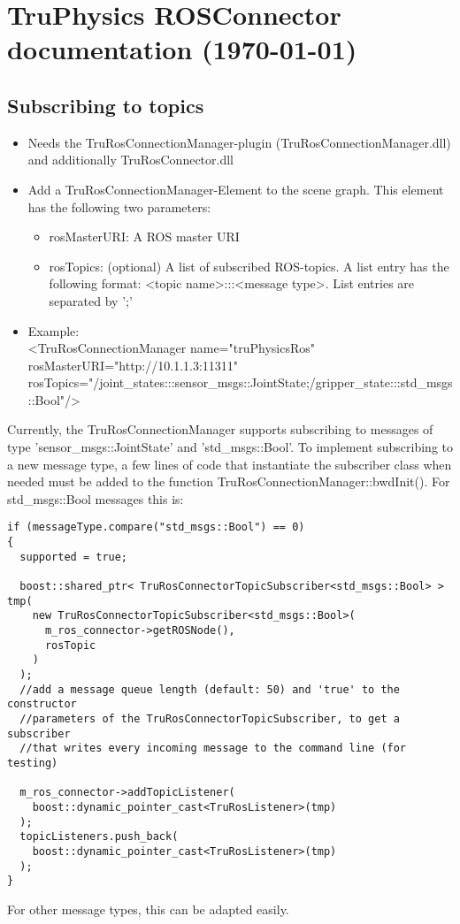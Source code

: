 \documentclass[a4paper, 10pt]{article}
\begin{document}
\lstset{language=[Visual]C++}
\section*{TruPhysics ROSConnector documentation (\today)}
    \subsection*{Subscribing to topics}
    \begin{itemize}
        \item Needs the TruRosConnectionManager-plugin (TruRosConnectionManager.dll) and additionally TruRosConnector.dll

        \item Add a TruRosConnectionManager-Element to the scene graph. This element has the following two parameters:
            \begin{itemize}
                \item rosMasterURI: A ROS master URI
                \item rosTopics: (optional) A list of subscribed ROS-topics. A list entry has the following format: <topic name>:::<message type>. List entries are separated by ';'
            \end{itemize}
        \item Example:\\
            <TruRosConnectionManager name="truPhysicsRos" \\
            rosMasterURI="http://10.1.1.3:11311" \\
            rosTopics="/joint_states:::sensor_msgs::JointState;/gripper_state:::std_msgs::Bool"/>
    \end{itemize}
            
    Currently, the TruRosConnectionManager supports subscribing to messages of type 'sensor_msgs::JointState' and 'std_msgs::Bool'. To implement subscribing to a new message type, a few lines of code that instantiate the subscriber class when needed must be added to the function TruRosConnectionManager::bwdInit(). For std_msgs::Bool messages this is:
\begin{lstlisting}[frame=single]
if (messageType.compare("std_msgs::Bool") == 0)
{
  supported = true;

  boost::shared_ptr< TruRosConnectorTopicSubscriber<std_msgs::Bool> > tmp(
    new TruRosConnectorTopicSubscriber<std_msgs::Bool>(
      m_ros_connector->getROSNode(),
      rosTopic
    )
  );
  //add a message queue length (default: 50) and 'true' to the constructor
  //parameters of the TruRosConnectorTopicSubscriber, to get a subscriber
  //that writes every incoming message to the command line (for testing)

  m_ros_connector->addTopicListener(
    boost::dynamic_pointer_cast<TruRosListener>(tmp)
  );
  topicListeners.push_back(
    boost::dynamic_pointer_cast<TruRosListener>(tmp)
  );
}
\end{lstlisting}        
For other message types, this can be adapted easily.
    
\end{document}
